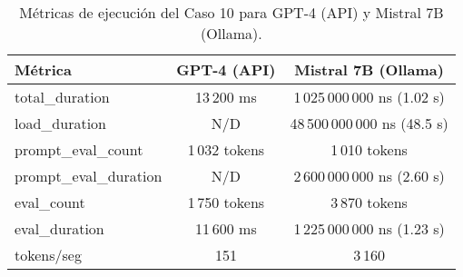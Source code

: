 
\begin{table}[h!]
\centering
\begin{tabular}{|l|c|c|}
\hline
\textbf{Métrica} & \textbf{GPT-4 (API)} & \textbf{Mistral 7B (Ollama)} \\
\hline
total\_duration & 13\,200 ms & 1\,025\,000\,000 ns (1.02 s) \\
load\_duration & N/D & 48\,500\,000\,000 ns (48.5 s) \\
prompt\_eval\_count & 1\,032 tokens & 1\,010 tokens \\
prompt\_eval\_duration & N/D & 2\,600\,000\,000 ns (2.60 s) \\
eval\_count & 1\,750 tokens & 3\,870 tokens \\
eval\_duration & 11\,600 ms & 1\,225\,000\,000 ns (1.23 s) \\
tokens/seg & 151 & 3\,160 \\
\hline
\end{tabular}
\caption{Métricas de ejecución del Caso 10 para GPT-4 (API) y Mistral 7B (Ollama).}
\end{table}
